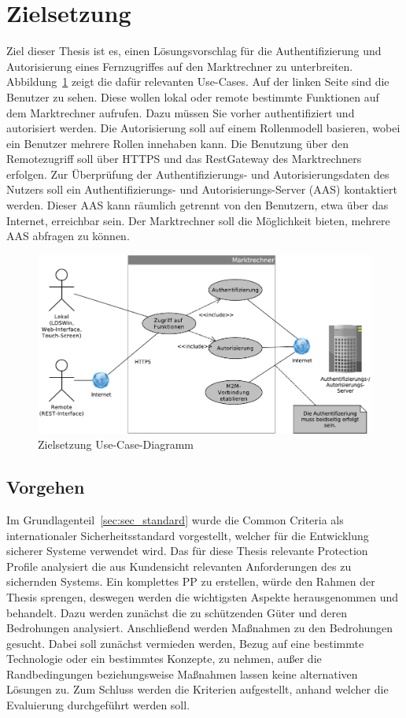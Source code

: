 \documentclass[11pt,a4paper]{report}
\begin{document}
\section{Zielsetzung}

Ziel dieser Thesis ist es, einen Lösungsvorschlag für die Authentifizierung und Autorisierung eines Fernzugriffes auf den Marktrechner zu unterbreiten. Abbildung~\ref{fig:uc_solution} zeigt die dafür relevanten Use-Cases. Auf der linken Seite sind die Benutzer zu sehen. Diese wollen lokal oder remote bestimmte Funktionen auf dem Marktrechner aufrufen. Dazu müssen Sie vorher authentifiziert und autorisiert werden. Die Autorisierung soll auf einem Rollenmodell basieren, wobei ein Benutzer mehrere Rollen innehaben kann. Die Benutzung über den Remotezugriff soll über HTTPS und das RestGateway des Marktrechners erfolgen. Zur Überprüfung der Authentifizierungs- und Autorisierungsdaten des Nutzers soll ein Authentifizierungs- und  Autorisierungs-Server (AAS) kontaktiert werden. Dieser AAS kann räumlich getrennt von den Benutzern, etwa über das Internet, erreichbar sein. Der Marktrechner soll die Möglichkeit bieten, mehrere AAS abfragen zu können.

\begin{figure}[htbp]
\centering
\includegraphics[scale=0.6]{images/ziel_usecase.pdf}
\caption{Zielsetzung Use-Case-Diagramm}
\label{fig:uc_solution}
\end{figure}

\subsection{Vorgehen}

Im Grundlagenteil~\ref{sec:sec_standard} wurde die Common Criteria als internationaler Sicherheitsstandard vorgestellt, welcher für die Entwicklung sicherer Systeme verwendet wird. Das für diese Thesis relevante Protection Profile analysiert die aus Kundensicht relevanten Anforderungen des zu sichernden Systems. Ein komplettes PP zu erstellen, würde den Rahmen der Thesis sprengen, deswegen werden die wichtigsten Aspekte herausgenommen und behandelt. Dazu werden zunächst die zu schützenden Güter und deren Bedrohungen analysiert. Anschließend werden Maßnahmen zu den Bedrohungen gesucht. Dabei soll zunächst vermieden werden, Bezug auf eine bestimmte Technologie oder ein bestimmtes Konzepte, zu nehmen, außer die Randbedingungen beziehungsweise Maßnahmen lassen keine alternativen Lösungen zu. Zum Schluss werden die Kriterien aufgestellt, anhand welcher die Evaluierung durchgeführt werden soll.
\end{document}
